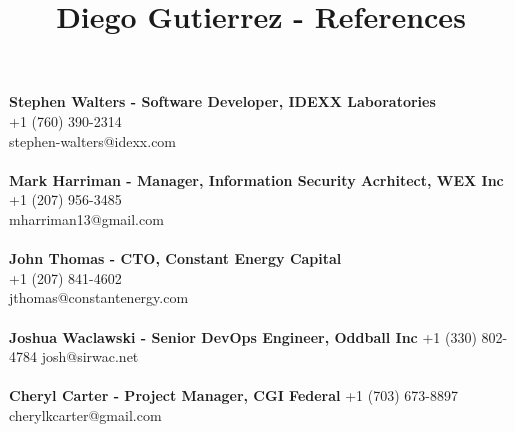 \documentclass[10pt]{article}
\title{Diego Gutierrez - References}
\date{}
\author{}
\makeatletter
\renewcommand{\maketitle}{\bgroup\setlength{\parindent}{0pt}
	\begin{flushleft}
		\LARGE\textbf{\@title}
		
		\normalsize\@author
	\end{flushleft}\egroup
}
\makeatother
\begin{document}
\maketitle
\thispagestyle{empty} %
\noindent\textbf{Stephen Walters - Software Developer, IDEXX Laboratories}\\
\normalsize +1 (760) 390-2314 \\
stephen-walters@idexx.com \\
\\
\noindent\textbf{Mark Harriman - Manager, Information Security Acrhitect, WEX Inc}\\
\normalsize +1 (207) 956-3485\\
mharriman13@gmail.com\\
\\
\noindent\textbf{John Thomas - CTO, Constant Energy Capital}\\
\normalsize +1 (207) 841-4602\\
jthomas@constantenergy.com\\
\\
\noindent\textbf{Joshua Waclawski - Senior DevOps Engineer, Oddball Inc}
\normalsize +1 (330) 802-4784
josh@sirwac.net\\
\\
\noindent\textbf{Cheryl Carter - Project Manager, CGI Federal}
\normalsize +1 (703) 673-8897
cherylkcarter@gmail.com
\end{document}
